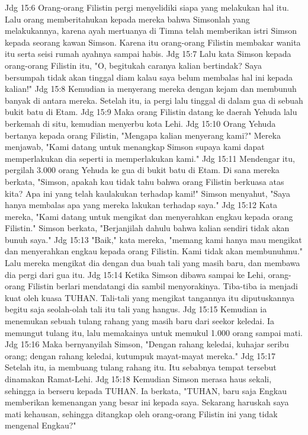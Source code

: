Jdg 15:6  Orang-orang Filistin pergi menyelidiki siapa yang melakukan hal itu. Lalu orang memberitahukan kepada mereka bahwa Simsonlah yang melakukannya, karena ayah mertuanya di Timna telah memberikan istri Simson kepada seorang kawan Simson. Karena itu orang-orang Filistin membakar wanita itu serta seisi rumah ayahnya sampai habis.
Jdg 15:7  Lalu kata Simson kepada orang-orang Filistin itu, "O, begitukah caranya kalian bertindak? Saya bersumpah tidak akan tinggal diam kalau saya belum membalas hal ini kepada kalian!"
Jdg 15:8  Kemudian ia menyerang mereka dengan kejam dan membunuh banyak di antara mereka. Setelah itu, ia pergi lalu tinggal di dalam gua di sebuah bukit batu di Etam.
Jdg 15:9  Maka orang Filistin datang ke daerah Yehuda lalu berkemah di situ, kemudian menyerbu kota Lehi.
Jdg 15:10  Orang Yehuda bertanya kepada orang Filistin, "Mengapa kalian menyerang kami?" Mereka menjawab, "Kami datang untuk menangkap Simson supaya kami dapat memperlakukan dia seperti ia memperlakukan kami."
Jdg 15:11  Mendengar itu, pergilah 3.000 orang Yehuda ke gua di bukit batu di Etam. Di sana mereka berkata, "Simson, apakah kau tidak tahu bahwa orang Filistin berkuasa atas kita? Apa ini yang telah kaulakukan terhadap kami!" Simson menyahut, "Saya hanya membalas apa yang mereka lakukan terhadap saya."
Jdg 15:12  Kata mereka, "Kami datang untuk mengikat dan menyerahkan engkau kepada orang Filistin." Simson berkata, "Berjanjilah dahulu bahwa kalian sendiri tidak akan bunuh saya."
Jdg 15:13  "Baik," kata mereka, "memang kami hanya mau mengikat dan menyerahkan engkau kepada orang Filistin. Kami tidak akan membunuhmu." Lalu mereka mengikat dia dengan dua buah tali yang masih baru, dan membawa dia pergi dari gua itu.
Jdg 15:14  Ketika Simson dibawa sampai ke Lehi, orang-orang Filistin berlari mendatangi dia sambil menyorakinya. Tiba-tiba ia menjadi kuat oleh kuasa TUHAN. Tali-tali yang mengikat tangannya itu diputuskannya begitu saja seolah-olah tali itu tali yang hangus.
Jdg 15:15  Kemudian ia menemukan sebuah tulang rahang yang masih baru dari seekor keledai. Ia memungut tulang itu, lalu memakainya untuk memukul 1.000 orang sampai mati.
Jdg 15:16  Maka bernyanyilah Simson, "Dengan rahang keledai, kuhajar seribu orang; dengan rahang keledai, kutumpuk mayat-mayat mereka."
Jdg 15:17  Setelah itu, ia membuang tulang rahang itu. Itu sebabnya tempat tersebut dinamakan Ramat-Lehi.
Jdg 15:18  Kemudian Simson merasa haus sekali, sehingga ia berseru kepada TUHAN. Ia berkata, "TUHAN, baru saja Engkau memberikan kemenangan yang besar ini kepada saya. Sekarang haruskah saya mati kehausan, sehingga ditangkap oleh orang-orang Filistin ini yang tidak mengenal Engkau?"
